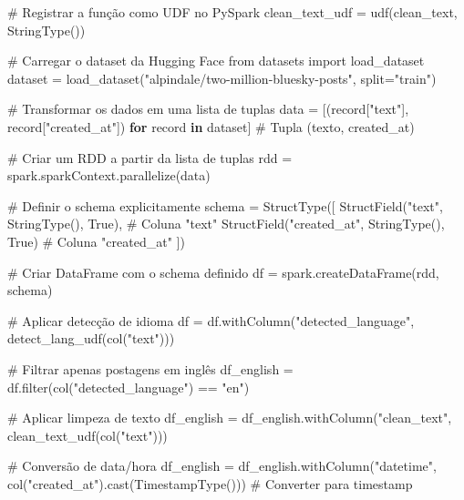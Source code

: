 \documentclass[
  letterpaper,
  DIV=11,
  numbers=noendperiod]{scrartcl}
\newenvironment{Shaded}{\begin{snugshade}}{\end{snugshade}}
\newcommand{\BuiltInTok}[1]{\textcolor[rgb]{0.00,0.23,0.31}{#1}}
\newcommand{\CommentTok}[1]{\textcolor[rgb]{0.37,0.37,0.37}{#1}}
\newcommand{\ControlFlowTok}[1]{\textcolor[rgb]{0.00,0.23,0.31}{\textbf{#1}}}
\newcommand{\ImportTok}[1]{\textcolor[rgb]{0.00,0.46,0.62}{#1}}
\newcommand{\KeywordTok}[1]{\textcolor[rgb]{0.00,0.23,0.31}{\textbf{#1}}}
\newcommand{\NormalTok}[1]{\textcolor[rgb]{0.00,0.23,0.31}{#1}}
\newcommand{\OperatorTok}[1]{\textcolor[rgb]{0.37,0.37,0.37}{#1}}
\newcommand{\StringTok}[1]{\textcolor[rgb]{0.13,0.47,0.30}{#1}}
\newcommand{\VariableTok}[1]{\textcolor[rgb]{0.07,0.07,0.07}{#1}}
\begin{document}
\begin{Shaded}
\begin{Highlighting}[]
\CommentTok{\# Registrar a função como UDF no PySpark}
\NormalTok{clean\_text\_udf }\OperatorTok{=}\NormalTok{ udf(clean\_text, StringType())}

\CommentTok{\# Carregar o dataset da Hugging Face}
\ImportTok{from}\NormalTok{ datasets }\ImportTok{import}\NormalTok{ load\_dataset}
\NormalTok{dataset }\OperatorTok{=}\NormalTok{ load\_dataset(}\StringTok{"alpindale/two{-}million{-}bluesky{-}posts"}\NormalTok{, split}\OperatorTok{=}\StringTok{"train"}\NormalTok{)}

\CommentTok{\# Transformar os dados em uma lista de tuplas}
\NormalTok{data }\OperatorTok{=}\NormalTok{ [(record[}\StringTok{"text"}\NormalTok{], record[}\StringTok{"created\_at"}\NormalTok{]) }\ControlFlowTok{for}\NormalTok{ record }\KeywordTok{in}\NormalTok{ dataset]  }\CommentTok{\# Tupla (texto, created\_at)}

\CommentTok{\# Criar um RDD a partir da lista de tuplas}
\NormalTok{rdd }\OperatorTok{=}\NormalTok{ spark.sparkContext.parallelize(data)}

\CommentTok{\# Definir o schema explicitamente}
\NormalTok{schema }\OperatorTok{=}\NormalTok{ StructType([}
\NormalTok{    StructField(}\StringTok{"text"}\NormalTok{, StringType(), }\VariableTok{True}\NormalTok{),           }\CommentTok{\# Coluna "text"}
\NormalTok{    StructField(}\StringTok{"created\_at"}\NormalTok{, StringType(), }\VariableTok{True}\NormalTok{)      }\CommentTok{\# Coluna "created\_at"}
\NormalTok{])}

\CommentTok{\# Criar DataFrame com o schema definido}
\NormalTok{df }\OperatorTok{=}\NormalTok{ spark.createDataFrame(rdd, schema)}

\CommentTok{\# Aplicar detecção de idioma}
\NormalTok{df }\OperatorTok{=}\NormalTok{ df.withColumn(}\StringTok{"detected\_language"}\NormalTok{, detect\_lang\_udf(col(}\StringTok{"text"}\NormalTok{)))}

\CommentTok{\# Filtrar apenas postagens em inglês}
\NormalTok{df\_english }\OperatorTok{=}\NormalTok{ df.}\BuiltInTok{filter}\NormalTok{(col(}\StringTok{"detected\_language"}\NormalTok{) }\OperatorTok{==} \StringTok{"en"}\NormalTok{)}

\CommentTok{\# Aplicar limpeza de texto}
\NormalTok{df\_english }\OperatorTok{=}\NormalTok{ df\_english.withColumn(}\StringTok{"clean\_text"}\NormalTok{, clean\_text\_udf(col(}\StringTok{"text"}\NormalTok{)))}

\CommentTok{\# Conversão de data/hora}
\NormalTok{df\_english }\OperatorTok{=}\NormalTok{ df\_english.withColumn(}\StringTok{"datetime"}\NormalTok{, col(}\StringTok{"created\_at"}\NormalTok{).cast(TimestampType()))  }\CommentTok{\# Converter para timestamp}


\end{Highlighting}
\end{Shaded}
\end{document}
